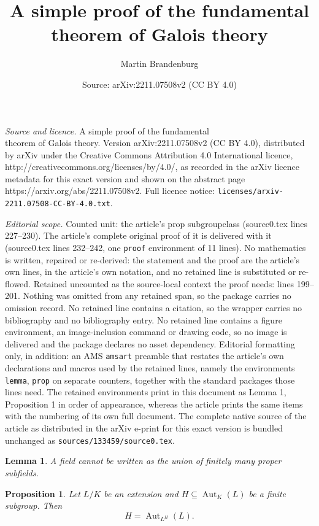 \documentclass[10pt,a4paper]{amsart}
\title{A simple proof of the fundamental\\theorem of Galois theory}
\author{Martin Brandenburg}
\date{Source: arXiv:2211.07508v2 (CC BY 4.0)}
\newtheorem{lemma}{Lemma}
\newtheorem{prop}{Proposition}
\DeclareMathOperator{\Aut}{Aut}
\begin{document}
\maketitle

\noindent\emph{Source and licence.} A simple proof of the fundamental\\theorem of Galois theory. Version arXiv:2211.07508v2 (CC BY 4.0), distributed by arXiv under the Creative Commons Attribution 4.0 International licence, http://creativecommons.org/licenses/by/4.0/, as recorded in the arXiv licence metadata for this exact version and shown on the abstract page https://arxiv.org/abs/2211.07508v2. Full licence notice: \texttt{licenses/arxiv-2211.07508-CC-BY-4.0.txt}.\par\smallskip

\noindent\textit{Editorial scope.} Counted unit: the article's prop subgroupclass (source0.tex lines 227--230). The article's complete original proof of it is delivered with it (source0.tex lines 232--242, one \texttt{proof} environment of 11 lines). No mathematics is written, repaired or re-derived: the statement and the proof are the article's own lines, in the article's own notation, and no retained line is substituted or re-flowed.  Retained uncounted as the source-local context the proof needs: lines 199--201.  Nothing was omitted from any retained span, so the package carries no omission record.  No retained line contains a citation, so the wrapper carries no bibliography and no bibliography entry.  No retained line contains a figure environment, an image-inclusion command or drawing code, so no image is delivered and the package declares no asset dependency.  Editorial formatting only, in addition: an AMS \texttt{amsart} preamble that restates the article's own declarations and macros used by the retained lines, namely the environments \texttt{lemma}, \texttt{prop} on separate counters, together with the standard packages those lines need.  The retained environments print in this document as Lemma 1, Proposition 1 in order of appearance, whereas the article prints the same items with the numbering of its own full document.  The complete native source of the article as distributed in the arXiv e-print for this exact version is bundled unchanged as \texttt{sources/133459/source0.tex}.
\begin{lemma} \label{fieldunion}
A field cannot be written as the union of finitely many proper subfields.
\end{lemma}

\begin{prop} \label{subgroupclass}
Let $L/K$ be an extension and $H \subseteq \Aut_K(L)$ be a finite subgroup. Then
\[H = \Aut_{L^H}(L).\]
\end{prop}
\end{document}
